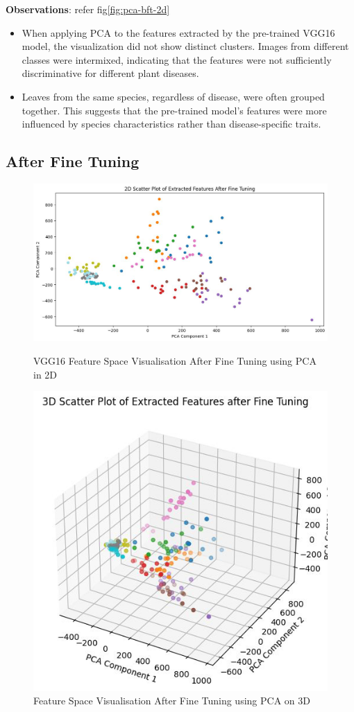 \textbf{Observations}: refer fig\ref{fig:pca-bft-2d}
\begin{itemize}
    \item When applying PCA to the features extracted by the pre-trained VGG16 model, the visualization did not show distinct clusters. Images from different classes were intermixed, indicating that the features were not sufficiently discriminative for different plant diseases.
    \item Leaves from the same species, regardless of disease, were often grouped together. This suggests that the pre-trained model's features were more influenced by species characteristics rather than disease-specific traits.
\end{itemize}

\subsection{After Fine Tuning}

\begin{figure}
    \centering
    \includegraphics[width=1\linewidth]{graphics//chapter7/pca vis aft 2d.png}
    \caption{VGG16 Feature Space Visualisation After Fine Tuning using PCA in 2D}
    \label{fig:pca-aft-2d}
    
    \includegraphics[width=0.75\linewidth]{graphics//chapter7/pca vis after fine tuning 3d.png}
    \caption{Feature Space Visualisation After Fine Tuning using PCA on 3D}
    \label{fig:pca-aft-}
\end{figure}


